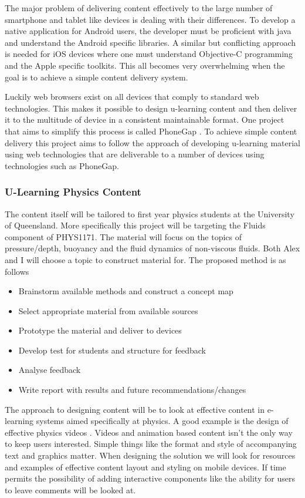 \documentclass[12pt,a4paper]{article}  %
\begin{document}
The major problem of delivering content effectively to the large
number of smartphone and tablet like devices is dealing with their
differences.  To develop a native application for Android users, the
developer must be proficient with java and understand the Android
specific libraries. A similar but conflicting approach is needed for
iOS devices where one must understand Objective-C programming and the
Apple specific toolkits. This all becomes very overwhelming when the
goal is to achieve a simple content delivery system. 

Luckily web browsers exist on all devices that comply to standard web
technologies. This makes it possible to design u-learning content and
then deliver it to the multitude of device in a consistent
maintainable format. One project that aims to simplify this process is
called PhoneGap \cite{phonegap}. To achieve simple content delivery
this project aims to follow the approach of developing u-learning
material using web technologies that are deliverable to a number of
devices using technologies such as PhoneGap.

\subsubsection*{U-Learning Physics Content}

The content itself will be tailored to first year physics students at
the University of Queensland. More specifically this project will be
targeting the Fluids component of PHYS1171. The material will focus
on the topics of pressure/depth, buoyancy and the fluid dynamics of
non-viscous fluids. Both Alex and I will choose a topic to
construct material for. The proposed method is as follows

\begin{itemize}
  \item Brainstorm available methods and construct a concept map
  \item Select appropriate material from available sources
  \item Prototype the material and deliver to devices
  \item Develop test for students and structure for feedback
  \item Analyse feedback
  \item Write report with results and future recommendations/changes
\end{itemize}

The approach to designing content will be to look at effective content
in e-learning systems aimed specifically at physics. A good example is
the design of effective physics videos \cite{vid}. Videos and
animation based content isn't the only way to keep users interested.
Simple things like the format and style of accompanying text and
graphics matter. When designing the solution we will look for
resources and examples of effective content layout and styling on
mobile devices. If time permits the possibility of adding interactive
components like the ability for users to leave comments will be looked
at.
\end{document}
